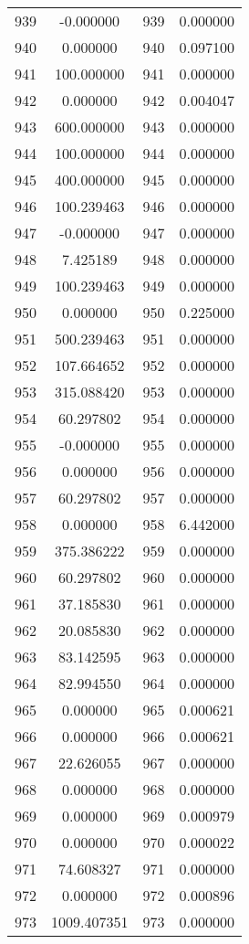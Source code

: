 \documentclass[12pt]{article}
\begin{document}
\begin{longtable}{@{}cccc@{}}
939 & -0.000000 & 939 & 0.000000 \\
940 & 0.000000 & 940 & 0.097100 \\
941 & 100.000000 & 941 & 0.000000 \\
942 & 0.000000 & 942 & 0.004047 \\
943 & 600.000000 & 943 & 0.000000 \\
944 & 100.000000 & 944 & 0.000000 \\
945 & 400.000000 & 945 & 0.000000 \\
946 & 100.239463 & 946 & 0.000000 \\
947 & -0.000000 & 947 & 0.000000 \\
948 & 7.425189 & 948 & 0.000000 \\
949 & 100.239463 & 949 & 0.000000 \\
950 & 0.000000 & 950 & 0.225000 \\
951 & 500.239463 & 951 & 0.000000 \\
952 & 107.664652 & 952 & 0.000000 \\
953 & 315.088420 & 953 & 0.000000 \\
954 & 60.297802 & 954 & 0.000000 \\
955 & -0.000000 & 955 & 0.000000 \\
956 & 0.000000 & 956 & 0.000000 \\
957 & 60.297802 & 957 & 0.000000 \\
958 & 0.000000 & 958 & 6.442000 \\
959 & 375.386222 & 959 & 0.000000 \\
960 & 60.297802 & 960 & 0.000000 \\
961 & 37.185830 & 961 & 0.000000 \\
962 & 20.085830 & 962 & 0.000000 \\
963 & 83.142595 & 963 & 0.000000 \\
964 & 82.994550 & 964 & 0.000000 \\
965 & 0.000000 & 965 & 0.000621 \\
966 & 0.000000 & 966 & 0.000621 \\
967 & 22.626055 & 967 & 0.000000 \\
968 & 0.000000 & 968 & 0.000000 \\
969 & 0.000000 & 969 & 0.000979 \\
970 & 0.000000 & 970 & 0.000022 \\
971 & 74.608327 & 971 & 0.000000 \\
972 & 0.000000 & 972 & 0.000896 \\
973 & 1009.407351 & 973 & 0.000000 \\

\end{longtable}
\end{document}
